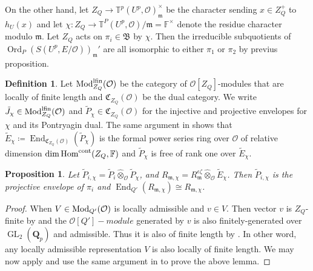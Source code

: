 \documentclass[leqno]{amsart}
\newcommand{\fF}{\mathbb{F}} %
\newcommand{\TT}{\mathbb{T}} %
\newcommand{\lfMod}{\textnormal{Mod}^{\textnormal{lfin}}}
\DeclareMathOperator{\Mod}{\textnormal{Mod}}
\newcommand{\B}{\mathfrak B}
\newcommand{\fC}{\mathfrak{C}}
\DeclareMathOperator{\Ord}{Ord}
\newcommand{\cont}{\textnormal{cont}}
\DeclareMathOperator{\GL}{GL}
\newcommand{\Qp}{\mathbf{Q}_p}
\newcommand{\oo}{\mathcal{O}} %
\newcommand{\fm}{\mathfrak{m}}
\DeclareMathOperator{\End}{End}
\DeclareMathOperator{\Hom}{Hom}
\newtheorem{prop}[thm]{Proposition}
\theoremstyle{definition}
\newtheorem{defn}[thm]{Definition}
\theoremstyle{remark}
\begin{document}
On the other hand,
let $Z_Q\to \TT^p(U^p,\oo)_{\fm}^{\times}$
be the character
sending $x\in Z_Q^+$ to $h_U(x)$
and let 
$\chi\colon Z_Q\to \TT^P(U^p,\oo)/\fm=\fF^\times$
denote the residue character modulo $\fm$.
Let $Z_Q$ acts on $\pi_i\in \B$ by $\chi$.
Then the irreducible subquotients
of  $\Ord_P(S(U^p,E/\oo))_{\fm}'$
are all isomorphic to either $\pi_1$ or  $\pi_2$
by previus proposition.


\begin{defn}

Let $\lfMod_{Z_Q}(\oo)$
be the category of $\oo[Z_Q]$-modules
that are locally of finite length
and  $\fC_{Z_Q}(\oo)$ be the dual category.
We write 
$\tilde{J}_\chi\in \lfMod_{Z_Q}(\oo)$ and 
$\tilde{P}_\chi\in \fC_{Z_Q}(\oo)$
for the injective and projective envelopes
for $\chi$ and its Pontryagin dual.
The same argument in \cite[Prop 3.34]{pask}
shows that 
$\tilde{E}_\chi\coloneqq 
\End_{\fC_{Z_Q}(\oo)}(\tilde{P}_\chi)$
is the formal power series ring over $\oo$ 
of relative dimension $\dim\Hom^{\cont}(Z_Q,\fF)$
and $\tilde{P}_\chi$ is free of rank one over 
$\tilde{E}_\chi$.

\end{defn}


\begin{prop}\label{prop:envelope}
	Let $\tilde{P}_{i,\chi}=
	\tilde{P}_i\hat{\otimes}_{\oo}\tilde{P}_\chi$,
	and $R_{\fm, \chi}=R_\fm^{\epsilon\zeta}
	\hat{\otimes}_{\oo}\tilde{E}_\chi$.
	Then $\tilde{P}_{i,\chi}$
	is the projective envelope
	of $\pi_i$ and 
	$\End_{Q'}(R_{\fm, \chi}) \cong R_{\fm,\chi}$.
\end{prop}
\begin{proof}
	When $V\in \Mod_{Q'}(\oo)$
	is locally admissible and $v\in V$.
	Then  vector 
	$v$ is  $Z_Q$-finite by \cite[Lem 2.3.5]{emeI}
	and the $\oo[Q']-module$
	generated by $v$ is also 
	finitely-generated over  $\GL_2(\Qp)$
	and admissible.
	Thus it is also of finite length 
	by \cite[Thm 2.3.8]{emeI}.
	In other word,
	any locally admissible representation $V$
	is also locally of finite length.
	We may now apply \cite[Lem B.6]{GN}
	and use the same argument in \cite[Lem B.8]{GN}
	to prove the above lemma.
\end{proof}
\end{document}
